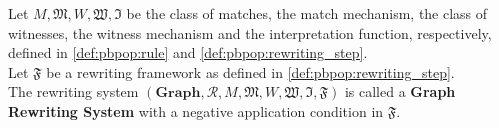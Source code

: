     
    \begin{definition}
      Let $M, \mathfrak{M}, W, \mathfrak{W}, \mathfrak{I}$ be the class of \pbpop matches, the match mechanism, the class of \pbpop witnesses, the witness mechanism and the interpretation function, respectively, defined in \autoref{def:pbpop:rule} and \autoref{def:pbpop:rewriting_step}.
      \\
      Let $\mathfrak{F}$ be a \pbpop rewriting framework as defined in \autoref{def:pbpop:rewriting_step}.
      \\
      The rewriting system $(\mathbf{Graph}, \mathcal{R}, M, \mathfrak{M}, W, \mathfrak{W}, \mathfrak{I}, \mathfrak{F})$ is called a \textbf{\pbpop Graph Rewriting System} with a negative application condition in $\mathfrak{F}$.
    \end{definition}
    
